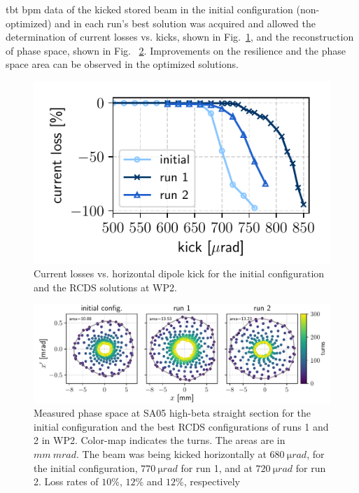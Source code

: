 \gls*{tbt} \gls*{bpm} data of the kicked stored beam  in the initial configuration (non-optimized) and in each run's best solution was acquired and allowed the determination of current losses vs. kicks, shown in Fig.~\ref{fig:loss_kicks_newtunes}, and the reconstruction of phase space, shown in Fig. ~\ref{fig:newtunes_phase}. Improvements on the resilience and the phase space area can be observed in the optimized solutions.
\begin{figure}[tb]
    \centering
    \includegraphics[width=0.6\columnwidth]{Images/WEPL087_f3.pdf}
    \caption[Current losses vs. horizontal dipole kick for the initial configuration and the RCDS solutions at WP 2.]{Current losses vs. horizontal dipole kick for the initial configuration and the \gls*{RCDS} solutions at \gls*{WP2}.}
    \label{fig:loss_kicks_newtunes}
\end{figure}
\begin{figure}[htb]
    \includegraphics[width=\textwidth]{Images/WEPL087_f4.pdf}
    \caption[Measured phase space at SA05 high-beta straight section for the initial configuration and the best RCDS configurations of runs 1 and 2 in WP2.]{Measured phase space at SA05 high-beta straight section for the initial configuration and the best \gls*{RCDS} configurations of runs 1 and 2 in \gls*{WP2}. Color-map indicates the turns. The areas are in $\unit{mm}~\unit{mrad}$. The beam was being kicked horizontally at $680~\unit{\micro rad}$, for the initial configuration, $770~\unit{\micro rad}$ for run 1, and at $720~\unit{\micro rad}$ for run 2. Loss rates of $10\%$, $12\%$ and $12\%$, respectively}
    \label{fig:newtunes_phase}
\end{figure}

